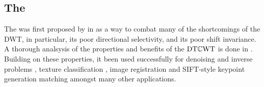 
% 
\subsection{The \DTCWT}
  The \DTCWT was first proposed by \citeauthor{kingsbury_dual-tree_1998} in
  \cite{kingsbury_dual-tree_1998, kingsbury_dual-tree_1998-1} as a way to combat
  many of the shortcomings of the DWT, in particular, its poor directional
  selectivity, and its poor shift invariance. A thorough analsysis of the
  properties and benefits of the $\mathrm{DT}\mathbb{C}\mathrm{WT}$ is done in
  \cite{kingsbury_image_1999,selesnick_dual-tree_2005}. Building on these
  properties, it been used
  successfully for denoising and inverse problems \cite{rivaz_bayesian_2001,
  zhang_bayesian_2008, zhang_variational_2015, miller_image_2008}, texture
  classification \cite{hatipoglu_texture_1999, rivaz_complex_1999}, image
  registration \cite{loo_motion-estimation-based_2001, chen_efficient_2012}
  and
  SIFT-style keypoint generation matching \cite{fauqueur_multiscale_2006,
  anderson_determining_2005, anderson_rotation-invariant_2006,
  bendale_multiscale_2010, ng_robust_2012} amongst many other applications. 

